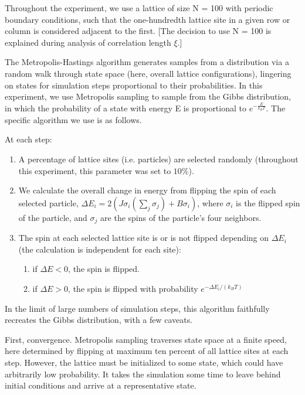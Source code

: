 \documentclass[letter,scriptaddress,twocolumn, prl]{revtex4}
\begin{document}
Throughout the experiment, we use a lattice of size N = 100 with periodic boundary conditions, such that the one-hundredth lattice site in a given row or column is considered adjacent to the first. [The decision to use N = 100 is explained during analysis of correlation length $\xi$.]

The Metropolis-Hastings algorithm generates samples from a distribution via a random walk through state space (here, overall lattice configurations), lingering on states for simulation steps proportional to their probabilities. In this experiment, we use Metropolis sampling to sample from the Gibbs distribution, in which the probability of a state with energy E is proportional to $e^{-\frac{E}{k_BT}}$. The specific algorithm we use is as follows.

At each step:
\begin{enumerate}
	\item A percentage of lattice sites (i.e. particles) are selected randomly (throughout this experiment, this parameter was set to $10\%$).
	\item We calculate the overall change in energy from flipping the spin of each selected particle, $\Delta E_i = 2(J\sigma_i(\sum_j\sigma_j) + B\sigma_i)$, where $\sigma_i$ is the flipped spin of the particle, and $\sigma_j$ are the spins of the particle's four neighbors.
	\item The spin at each selected lattice site is or is not flipped depending on $\Delta E_i$ (the calculation is independent for each site):
	\begin{enumerate}
		\item if $\Delta E < 0$, the spin is flipped.
		\item if $\Delta E > 0$, the spin is flipped with probability $e^{-\Delta E_i/(k_BT)}$
	\end{enumerate}
\end{enumerate}

In the limit of large numbers of simulation steps, this algorithm faithfully recreates the Gibbs distribution, with a few caveats.

First, convergence. Metropolis sampling traverses state space at a finite speed, here determined by flipping at maximum ten percent of all lattice sites at each step. However, the lattice must be initialized to some state, which could have arbitrarily low probability. It takes the simulation some time to leave behind initial conditions and arrive at a representative state. 
\end{document}
